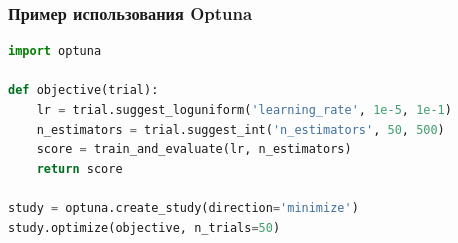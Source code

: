 \subsubsection{Пример использования Optuna}

\begin{lstlisting}[language=Python]
import optuna

def objective(trial):
    lr = trial.suggest_loguniform('learning_rate', 1e-5, 1e-1)
    n_estimators = trial.suggest_int('n_estimators', 50, 500)
    score = train_and_evaluate(lr, n_estimators)
    return score

study = optuna.create_study(direction='minimize')
study.optimize(objective, n_trials=50)
\end{lstlisting}
